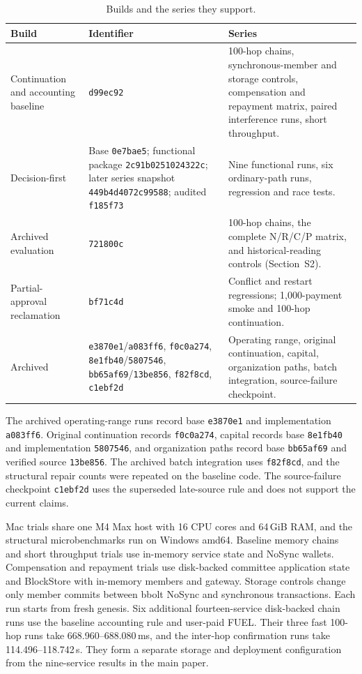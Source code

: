 \begin{table}[t]
  \caption{Builds and the series they support.}
  \label{tab:supp-builds}
  \centering
  \small
  \begin{tabular}{@{}p{}p{}p{}@{}}
    \toprule
    Build & Identifier & Series \\
    \midrule
    Continuation and accounting baseline
      & \texttt{d99ec92}
      & 100-hop chains, synchronous-member and storage controls,
        compensation and repayment matrix, paired interference runs,
        short throughput. \\
    Decision-first
      & Base \texttt{0e7bae5}; functional package \texttt{2c91b0251024322c};
        later series snapshot \texttt{449b4d4072c99588}; audited \texttt{f185f73}
      & Nine functional runs, six ordinary-path runs, regression and race
        tests. \\
    Archived evaluation
      & \texttt{721800c}
      & 100-hop chains, the complete N/R/C/P matrix, and historical-reading controls (Section~S2). \\
    Partial-approval reclamation
      & \texttt{bf71c4d}
      & Conflict and restart regressions; 1,000-payment smoke and 100-hop continuation. \\
    Archived
      & \texttt{e3870e1}/\texttt{a083ff6}, \texttt{f0c0a274},
        \texttt{8e1fb40}/\texttt{5807546}, \texttt{bb65af69}/\texttt{13be856},
        \texttt{f82f8cd}, \texttt{c1ebf2d}
      & Operating range, original continuation, capital, organization
        paths, batch integration, source-failure checkpoint. \\
    \bottomrule
  \end{tabular}
\end{table}

The archived operating-range runs record base \texttt{e3870e1} and
implementation \texttt{a083ff6}. Original continuation records
\texttt{f0c0a274}, capital records base \texttt{8e1fb40} and implementation
\texttt{5807546}, and organization paths record base \texttt{bb65af69} and
verified source \texttt{13be856}. The archived batch integration uses
\texttt{f82f8cd}, and the structural repair counts were repeated on the
baseline code. The source-failure checkpoint \texttt{c1ebf2d} uses the
superseded late-source rule and does not support the current claims.

Mac trials share one M4 Max host with 16 CPU cores and 64\,GiB RAM, and the
structural microbenchmarks run on Windows amd64. Baseline memory chains and
short throughput trials use in-memory service state and NoSync wallets.
Compensation and repayment trials use disk-backed committee application state
and BlockStore with in-memory members and gateway. Storage controls change
only member commits between bbolt NoSync and synchronous transactions. Each
run starts from fresh genesis. Six additional fourteen-service disk-backed
chain runs use the baseline accounting rule and user-paid FUEL. Their three
fast 100-hop runs take 668.960--688.080\,ms, and the inter-hop confirmation
runs take 114.496--118.742\,s. They form a separate storage and deployment
configuration from the nine-service results in the main paper.

